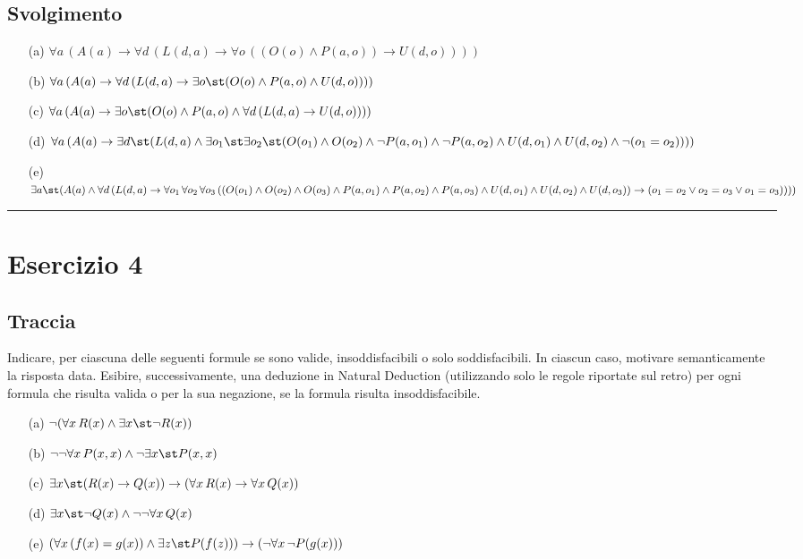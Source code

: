 \subsection*{Svolgimento}

\begin{enumerate}
    \item[(a)] \(\forall a\, (A(a) \rightarrow \forall d\, (L(d, a) \rightarrow \forall o\, ((O(o) \land P(a, o)) \rightarrow U(d, o))))\)
    \item[(b)] \(\forall a\, (A(a) \rightarrow \forall d\, (L(d, a) \rightarrow \exists o\st (O(o) \land P(a, o) \land U(d, o))))\)
    \item[(c)] \(\forall a\, (A(a) \rightarrow \exists o\st (O(o) \land P(a, o) \land \forall d\, (L(d, a) \rightarrow U(d, o))))\)
    \item[(d)] \(\forall a\, (A(a) \rightarrow \exists d\st (L(d, a) \land \exists o_1\st \exists o_2\st (O(o_1) \land O(o_2) \land \neg P(a, o_1) \land \neg P(a, o_2) \land U(d, o_1) \land U(d, o_2) \land \neg(o_1 = o_2))))\)
    \item[(e)] \(\exists a\st (A(a) \land \forall d\, (L(d, a) \rightarrow \forall o_1\, \forall o_2\, \forall o_3\, ((O(o_1) \land O(o_2) \land O(o_3) \land P(a, o_1) \land P(a, o_2) \land P(a, o_3) \land U(d, o_1) \land U(d, o_2) \land U(d, o_3)) \rightarrow (o_1 = o_2 \lor o_2 = o_3 \lor o_1 = o_3))))\)
\end{enumerate}

\vspace{1em}
\hrule
\vspace{1em}

\section*{Esercizio 4}

\subsection*{Traccia}
Indicare, per ciascuna delle seguenti formule se sono valide, insoddisfacibili o solo soddisfacibili. In ciascun caso, motivare semanticamente la risposta data. Esibire, successivamente, una deduzione in Natural Deduction (utilizzando solo le regole riportate sul retro) per ogni formula che risulta valida o per la sua negazione, se la formula risulta insoddisfacibile.
\begin{enumerate}
    \item[(a)] \(\neg(\forall x\, R(x) \land \exists x\st \neg R(x))\)
    \item[(b)] \(\neg\neg\forall x\, P(x,x) \land \neg\exists x\st P(x,x)\)
    \item[(c)] \(\exists x\st (R(x) \rightarrow Q(x)) \rightarrow (\forall x\, R(x) \rightarrow \forall x\, Q(x))\)
    \item[(d)] \(\exists x\st \neg Q(x) \land \neg\neg\forall x\, Q(x)\)
    \item[(e)] \((\forall x\, (f(x)=g(x)) \land \exists z\st P(f(z))) \rightarrow (\neg\forall x\, \neg P(g(x)))\)
\end{enumerate}

